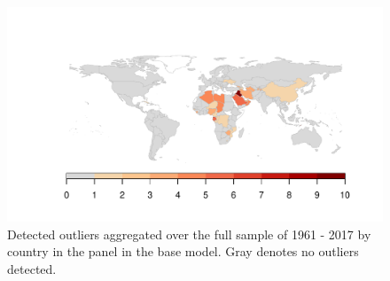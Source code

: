 \documentclass[11pt, letterpaper]{article}
\numberwithin{algorithm}{section}
\numberwithin{assumption}{section}
\numberwithin{lemma}{section}
\numberwithin{theorem}{section}
\numberwithin{corollary}{section}
\numberwithin{remark}{section}
\numberwithin{equation}{section}
\numberwithin{figure}{section}
\numberwithin{table}{section}
\begin{document}
\begin{figure}[!htbp]  \vspace{-.35in}
\centering
\includegraphics[width = \textwidth]{ctry_map.pdf}
\caption{Detected outliers aggregated over the full sample of 1961 - 2017 by country in the panel in the base model. Gray denotes no outliers detected. }
\label{fig_map_app1}
\end{figure}
\end{document}

